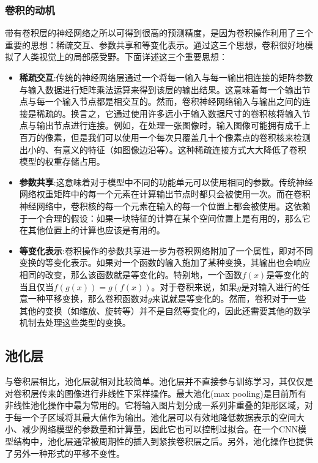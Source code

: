 \subsubsection{卷积的动机}
带有卷积层的神经网络之所以可得到很高的预测精度，是因为卷积操作利用了三个重要的思想：稀疏交互、参数共享和等变化表示。通过这三个思想，卷积很好地模拟了人类视觉上的局部感受野。下面详述这三个重要思想：

\begin{itemize}
  \item \textbf{稀疏交互}:传统的神经网络层通过一个将每一输入与每一输出相连接的矩阵参数与输入数据进行矩阵乘法运算来得到该层的输出结果。这意味着每一个输出节点与每一个输入节点都是相交互的。然而，卷积神经网络输入与输出之间的连接是稀疏的。换言之，它通过使用许多远小于输入数据尺寸的卷积核将输入节点与输出节点进行连接。例如，在处理一张图像时，输入图像可能拥有成千上百万的像素，但是我们可以使用一个每次只覆盖几十个像素点的卷积核来检测出小的、有意义的特征（如图像边沿等）。这种稀疏连接方式大大降低了卷积模型的权重存储占用。
  \item  \textbf{参数共享}:这意味着对于模型中不同的功能单元可以使用相同的参数。传统神经网络权重矩阵中的每一个元素在计算输出节点时都只会被使用一次。而在卷积神经网络中，卷积核的每一个元素在输入的每一个位置上都会被使用。这依赖于一个合理的假设：如果一块特征的计算在某个空间位置上是有用的，那么它在其他位置上的计算也应该是有用的。
  \item \textbf{等变化表示}:卷积操作的参数共享进一步为卷积网络附加了一个属性，即对不同变换的等变化表示。如果对一个函数的输入施加了某种变换，其输出也会响应相同的改变，那么该函数就是等变化的。特别地，一个函数$f(x)$是等变化的当且仅当$f(g(x))=g(f(x))$。对于卷积来说，如果$g$是对输入进行的任意一种平移变换，那么卷积函数对$g$来说就是等变化的。然而，卷积对于一些其他的变换（如缩放、旋转等）并不是自然等变化的，因此还需要其他的数学机制去处理这些类型的变换。
\end{itemize}

\subsection{池化层}
\label{chapter:chapter2-1-2}
与卷积层相比，池化层就相对比较简单。池化层并不直接参与训练学习，其仅仅是对卷积层传来的图像进行非线性下采样操作。最大池化(max pooling)是目前所有非线性池化操作中最为常用的。它将输入图片划分成一系列非重叠的矩形区域，对于每一个子区域将其最大值作为输出。池化层可以有效地降低数据表示的空间大小、减少网络模型的参数量和计算量，因此它也可以控制过拟合。在一个CNN模型结构中，池化层通常被周期性的插入到紧挨卷积层之后。另外，池化操作也提供了另外一种形式的平移不变性。

